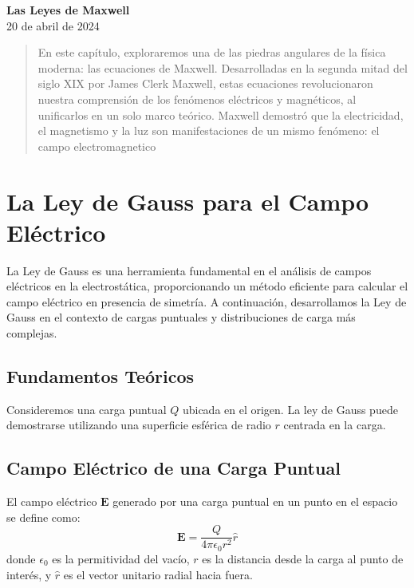 \documentclass{article}
\begin{document}
	\begin{center}
		\Large \textbf{Las Leyes de Maxwell} \\
		\vspace{1em}  
		\small 20 de abril de 2024
	\end{center}
	
	\begin{abstract}
		En este capítulo, exploraremos una de las piedras angulares de la física moderna: las ecuaciones de Maxwell.
		Desarrolladas en la segunda mitad del siglo XIX por James Clerk Maxwell, estas ecuaciones revolucionaron nuestra comprensión de los fenómenos eléctricos y magnéticos, al unificarlos en un solo marco teórico. Maxwell demostró que la electricidad, el magnetismo y la luz son manifestaciones de un mismo fenómeno: el campo electromagnetico
	\end{abstract}
	
	
	\section{La Ley de Gauss para el Campo Eléctrico}
	
	La Ley de Gauss es una herramienta fundamental en el análisis de campos eléctricos en la electrostática, proporcionando un método eficiente para calcular el campo eléctrico en presencia de simetría. A continuación, desarrollamos la Ley de Gauss en el contexto de cargas puntuales y distribuciones de carga más complejas.
	
	\subsection{Fundamentos Teóricos}
	Consideremos una carga puntual \( Q \) ubicada en el origen. La ley de Gauss puede demostrarse utilizando una superficie esférica de radio \( r \) centrada en la carga.
	
	\subsection{Campo Eléctrico de una Carga Puntual}
	El campo eléctrico \( \mathbf{E} \) generado por una carga puntual en un punto en el espacio se define como:
	\begin{equation}
		\mathbf{E} = \frac{Q}{4\pi \epsilon_0 r^2} \hat{r}
	\end{equation}
	donde \( \epsilon_0 \) es la permitividad del vacío, \( r \) es la distancia desde la carga al punto de interés, y \( \hat{r} \) es el vector unitario radial hacia fuera.
	
\end{document}
